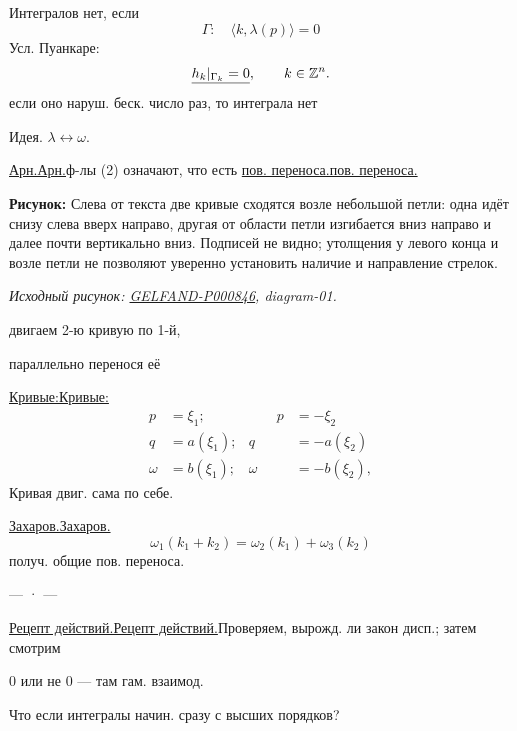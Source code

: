\documentclass[11pt]{article}
\theoremstyle{definition}
\theoremstyle{remark}
\newcommand{\SourceFigure}[3]{%
  \par\begingroup\color{blue!60!black}\textbf{\hyperref[#1:source-page]{Source figure #1/#2}:} #3%
  \par\textit{Consult the authoritative scan at this locator.}\endgroup\par%
}
\renewcommand{\SourceFigure}[3]{%
  \par\begingroup\color{blue!55!black}\textbf{Рисунок:} #3%
  \par{\small\textit{Исходный рисунок: \hyperref[#1:source-page]{#1}, #2.}}%
  \endgroup\par%
}
\let\DiplomaticMathUnderline\underline
\renewcommand{\underline}[1]{\ifmmode\DiplomaticMathUnderline{#1}\else\uline{#1}\fi}
\begin{document}
Интегралов нет, если
\begin{equation*}
\Gamma:\quad\langle k,\lambda(p)\rangle=0
\end{equation*}
Усл. Пуанкаре:
\begin{equation*}
\underline{h_k|_{\Gamma_k}=0},\qquad k\in\mathbb Z^n.
\end{equation*}
если оно наруш. беск. число раз, то интеграла нет

Идея. $\lambda\leftrightarrow\omega$.

\underline{Арн.}\quad ф-лы (2) означают, что есть \underline{пов. переноса.}

\SourceFigure{GELFAND-P000846}{diagram-01}{Слева от текста две кривые сходятся возле небольшой петли: одна идёт снизу слева вверх направо, другая от области петли изгибается вниз направо и далее почти вертикально вниз. Подписей не видно; утолщения у левого конца и возле петли не позволяют уверенно установить наличие и направление стрелок.}

двигаем 2-ю кривую по 1-й,

параллельно перенося её

\underline{Кривые:}
\begin{equation*}
\begin{aligned}
p&=\xi_1;&\qquad p&=-\xi_2\\
q&=a(\xi_1);&q&=-a(\xi_2)\\
\omega&=b(\xi_1);&\omega&=-b(\xi_2),
\end{aligned}
\end{equation*}
Кривая двиг. сама по себе.

\underline{Захаров.}
\begin{equation*}
\omega_1(k_1+k_2)=\omega_2(k_1)+\omega_3(k_2)
\end{equation*}
получ. общие пов. переноса.

\begin{center}— · —\end{center}

\underline{Рецепт действий.}\quad Проверяем, вырожд. ли закон дисп.; затем смотрим

0 или не 0 — там гам. взаимод.

Что если интегралы начин. сразу с высших порядков?
\end{document}

